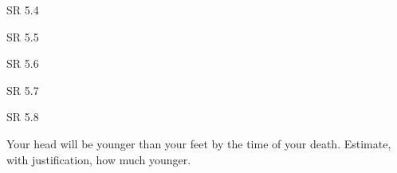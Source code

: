 \documentclass[minion]{homework}
\begin{document}
\begin{aproblems}

\hproblem SR 5.4

\hproblem SR 5.5

\hproblem SR 5.6

\hproblem SR 5.7

\hproblem SR 5.8

 Your head will be younger than your feet by the time of your death.  Estimate, with justification, how much younger.

\end{aproblems}
\end{document}
